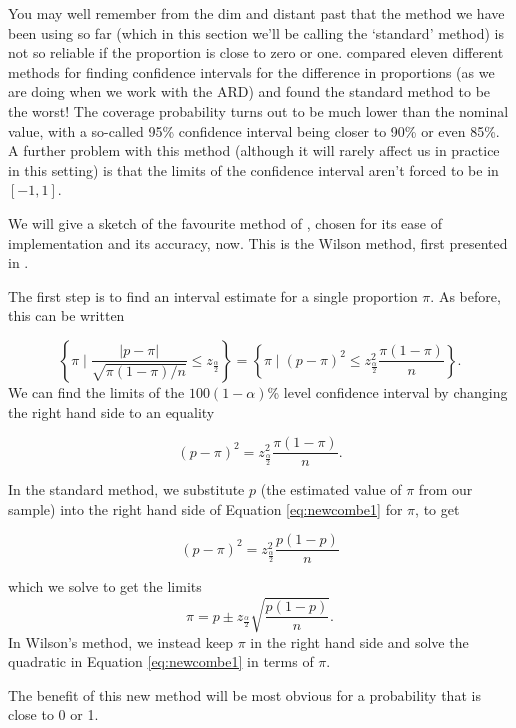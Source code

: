 \documentclass[
  openany]{book}
\theoremstyle{definition}
\theoremstyle{definition}
\theoremstyle{definition}
\theoremstyle{definition}
\theoremstyle{remark}
\begin{document}
You may well remember from the dim and distant past that the method we have been using so far (which in this section we'll be calling the `standard' method) is not so reliable if the proportion is close to zero or one. \citet{newcombe1998interval} compared eleven different methods for finding confidence intervals for the difference in proportions (as we are doing when we work with the ARD) and found the standard method to be the worst! The coverage probability turns out to be much lower than the nominal value, with a so-called 95\% confidence interval being closer to 90\% or even 85\%. A further problem with this method (although it will rarely affect us in practice in this setting) is that the limits of the confidence interval aren't forced to be in \(\left[-1,1\right]\).

We will give a sketch of the favourite method of \citet{newcombe1998interval}, chosen for its ease of implementation and its accuracy, now. This is the Wilson method, first presented in \citet{wilson1927probable}.

The first step is to find an interval estimate for a single proportion \(\pi\). As before, this can be written

\[\left\lbrace \pi \mid \frac{\lvert p - \pi \rvert}{\sqrt{\pi\left(1-\pi\right)/n}} \leq z_{\frac{\alpha}{2}} \right\rbrace = \left\lbrace \pi \mid \left(p - \pi\right)^2 \leq z^2_{\frac{\alpha}{2}}\frac{\pi\left(1-\pi\right)}{n} \right\rbrace. \]
We can find the limits of the \(100\left(1-\alpha\right)\)\% level confidence interval by changing the right hand side to an equality

\begin{equation}
\left(p - \pi\right)^2 = z^2_{\frac{\alpha}{2}}\frac{\pi\left(1-\pi\right)}{n}.
\label{eq:newcombe1}
\end{equation}

In the standard method, we substitute \(p\) (the estimated value of \(\pi\) from our sample) into the right hand side of Equation \eqref{eq:newcombe1} for \(\pi\), to get

\[\left(p - \pi\right)^2 = z^2_{\frac{\alpha}{2}}\frac{p\left(1-p\right)}{n}\]

which we solve to get the limits
\[ \pi = p \pm z_{\frac{\alpha}{2}}\sqrt{\frac{p\left(1-p\right)}{n}}.\]
In Wilson's method, we instead keep \(\pi\) in the right hand side and solve the quadratic in Equation \eqref{eq:newcombe1} in terms of \(\pi\).

The benefit of this new method will be most obvious for a probability that is close to 0 or 1.
\end{document}
